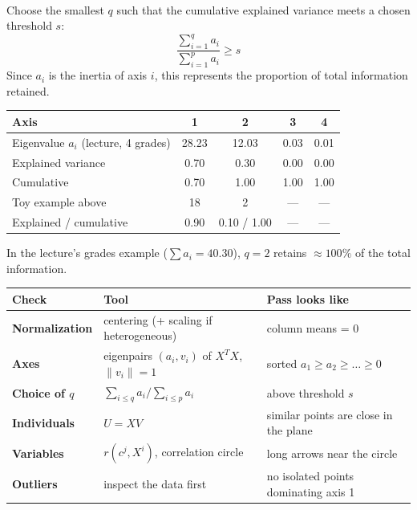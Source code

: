\documentclass[10pt,a4paper]{article}
\begin{document}
\vspace{4pt}

\\[3pt]
Choose the smallest $q$ such that the cumulative explained variance meets a chosen threshold $s$:
\[
\frac{\sum_{i=1}^q a_i}{\sum_{i=1}^p a_i} \ge s
\]
Since $a_i$ is the inertia of axis $i$, this represents the proportion of total information retained.
\begin{center}
\small
\begin{tabular}{lcccc}
\toprule
\rowcolor{lightbg}
\textbf{Axis} & 1 & 2 & 3 & 4 \\
\midrule
Eigenvalue $a_i$ (lecture, 4 grades) & 28.23 & 12.03 & 0.03 & 0.01 \\
Explained variance & 0.70 & 0.30 & 0.00 & 0.00 \\
Cumulative & 0.70 & 1.00 & 1.00 & 1.00 \\
\midrule
Toy example above & 18 & 2 & --- & --- \\
Explained / cumulative & 0.90 & 0.10 / 1.00 & --- & --- \\
\bottomrule
\end{tabular}
\end{center}
\vspace{-2pt}
\noindent In the lecture's grades example ($\sum a_i = 40.30$), $q = 2$ retains $\approx 100\%$ of the total information.

\vspace{4pt}

\par\vspace{3pt}
\begin{center}
\small
\begin{tabular}{lll}
\toprule
\rowcolor{lightbg}
\textbf{Check} & \textbf{Tool} & \textbf{Pass looks like} \\
\midrule
\textbf{Normalization} & centering (+ scaling if heterogeneous) & column means = 0 \\
\textbf{Axes} & eigenpairs $(a_i, v_i)$ of $X^T X$, $\|v_i\| = 1$ & sorted $a_1 \ge a_2 \ge \dots \ge 0$ \\
\textbf{Choice of $q$} & $\sum_{i \le q} a_i / \sum_{i \le p} a_i$ & above threshold $s$ \\
\textbf{Individuals} & $U = XV$ & similar points are close in the plane \\
\textbf{Variables} & $r(c^j, X^i)$, correlation circle & long arrows near the circle \\
\textbf{Outliers} & inspect the data first & no isolated points dominating axis 1 \\
\bottomrule
\end{tabular}
\end{center}
\end{document}
